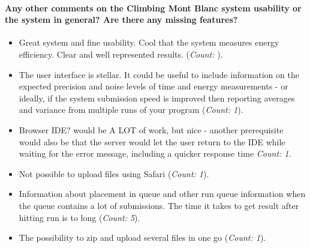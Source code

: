 \paragraph*{Any other comments on the Climbing Mont Blanc system usability or the system in general? Are there any missing features?}
\begin{itemize}
  \item Great system and fine usability. Cool that the system measures energy efficiency. Clear and well represented results.  (\textit{Count: }).
  \item The user interface is stellar. It could be useful to include information on the expected precision and noise levels of time and energy measurements - or ideally, if the system submission speed is improved then reporting averages and variance from multiple runs of your program (\textit{Count: 1}).
  \item Browser IDE? would be A LOT of work, but nice - another prerequisite would also be that the server would let the user return to the IDE while waiting for the error message, including a quicker response time \textit{Count: 1}.
  \item Not possible to upload files using Safari (\textit{Count: 1}).
  \item Information about placement in queue and other run queue information when the queue contains a lot of submissions. The time it takes to get result after hitting run is to long (\textit{Count: 5}).
  \item The possibility to zip and upload several files in one go (\textit{Count: 1}).
\end{itemize}

